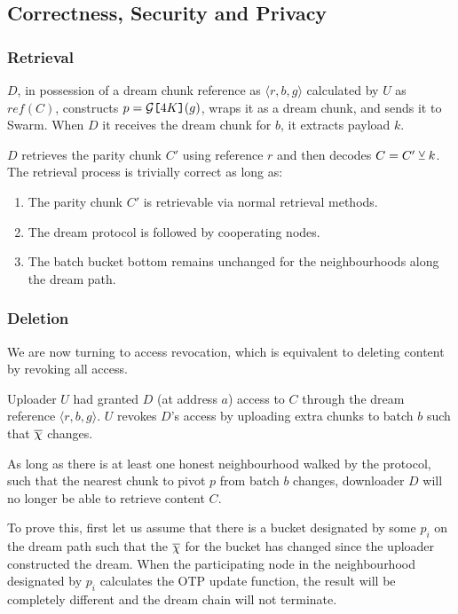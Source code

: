 \subsection{Correctness, Security and Privacy}

\subsubsection{Retrieval}
$D$, in possession of a dream chunk reference as 
$\langle r,b,g\rangle $ calculated by $U$  as $\mathit{ref}(C)$, constructs $p=\mathcal{G}\texttt{[}\/4K\/\texttt{]}(g)$, wraps it as a dream chunk, and sends it to Swarm. When $D$ it receives the dream chunk for $b$, it extracts payload $k$.

$D$ retrieves the parity chunk $C'$ using reference $r$ and then decodes $C=C'\veebar k$.
The retrieval process is trivially correct as long as: 
\begin{enumerate}
\item  The parity chunk $C'$ is retrievable via normal retrieval methods. 
\item The dream protocol is followed by cooperating nodes.
\item The batch bucket bottom remains unchanged for the neighbourhoods along the dream path. 
\end{enumerate}

\subsubsection{Deletion}
We are now turning to access revocation, which is equivalent to deleting content by revoking all access.


Uploader $U$ had granted $D$ (at address $a$) access to $C$ through the dream reference $\langle r,b,g\rangle $. $U$ revokes $D$'s access by uploading extra chunks to batch $b$ such that $\overline{\Huge\chi}$ changes.

As long as there is at least one honest neighbourhood walked by the protocol, such that the nearest chunk to pivot $p$ from batch $b$ changes, downloader $D$ will no longer be able to retrieve content $C$.

To prove this, first let us assume that there is a bucket designated by some $p_i$ on the dream path such that the $\overline{\Huge\chi}$ for the bucket has changed since the uploader constructed the dream. When the participating node in the neighbourhood designated by $p_i$ calculates the OTP update function, the result will be completely different and the dream chain will not terminate. 

